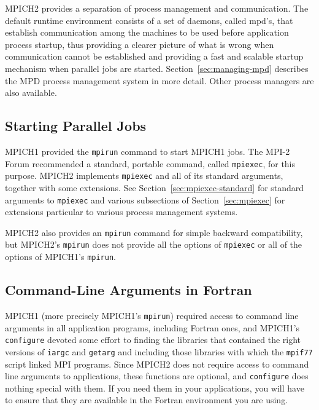 \documentclass[dvipdfm,11pt]{article}
\begin{document}
MPICH2 provides a separation of process management and communication.
The default runtime environment consists of a set of daemons, called
mpd's, that establish communication among the machines to be used before
application process startup, thus providing a clearer picture of what is
wrong when communication cannot be established and providing a fast and
scalable startup mechanism when parallel jobs are
started. Section~\ref{sec:managing-mpd} describes the MPD process
management system in more detail.  Other process managers are also available.

\subsection{Starting Parallel Jobs}
\label{sec:startup}

MPICH1 provided the \texttt{mpirun} command to start MPICH1 jobs.  The
MPI-2 Forum recommended a standard, portable command, called
\texttt{mpiexec}, for this purpose.  MPICH2 implements \texttt{mpiexec}
and all of its standard arguments, together with some extensions.  See
Section~\ref{sec:mpiexec-standard} for standard arguments to
\texttt{mpiexec} and various subsections of Section~\ref{sec:mpiexec}
for extensions particular to various process management systems.

MPICH2 also provides an \texttt{mpirun} command for simple backward
compatibility, but MPICH2's \texttt{mpirun} does not provide all the
options of \texttt{mpiexec} or all of the options of MPICH1's
\texttt{mpirun}. 


\subsection{Command-Line Arguments in Fortran}
\label{sec:fortran-command-line}

MPICH1 (more precisely MPICH1's \texttt{mpirun}) required access to
command line arguments in all application programs, including Fortran
ones, and MPICH1's \texttt{configure} devoted some effort to finding the
libraries that contained the right versions of \texttt{iargc} and
\texttt{getarg} and including those libraries with which the
\texttt{mpif77} script linked MPI programs.
Since MPICH2 does not require access to command line
arguments to applications, these functions are optional, and
\texttt{configure} does nothing special with them.  If you need them in
your applications, you will have to ensure that they are available in
the Fortran environment you are using.
\end{document}
